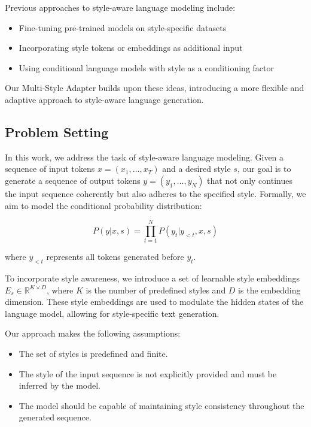 \documentclass{article} %
\begin{document}
Previous approaches to style-aware language modeling include:

\begin{itemize}
    \item Fine-tuning pre-trained models on style-specific datasets
    \item Incorporating style tokens or embeddings as additional input
    \item Using conditional language models with style as a conditioning factor
\end{itemize}

Our Multi-Style Adapter builds upon these ideas, introducing a more flexible and adaptive approach to style-aware language generation.

\subsection{Problem Setting}

In this work, we address the task of style-aware language modeling. Given a sequence of input tokens $x = (x_1, \ldots, x_T)$ and a desired style $s$, our goal is to generate a sequence of output tokens $y = (y_1, \ldots, y_N)$ that not only continues the input sequence coherently but also adheres to the specified style. Formally, we aim to model the conditional probability distribution:

\begin{equation}
    P(y|x, s) = \prod_{t=1}^N P(y_t|y_{<t}, x, s)
\end{equation}

where $y_{<t}$ represents all tokens generated before $y_t$.

To incorporate style awareness, we introduce a set of learnable style embeddings $E_s \in \mathbb{R}^{K \times D}$, where $K$ is the number of predefined styles and $D$ is the embedding dimension. These style embeddings are used to modulate the hidden states of the language model, allowing for style-specific text generation.

Our approach makes the following assumptions:
\begin{itemize}
    \item The set of styles is predefined and finite.
    \item The style of the input sequence is not explicitly provided and must be inferred by the model.
    \item The model should be capable of maintaining style consistency throughout the generated sequence.
\end{itemize}
\end{document}
